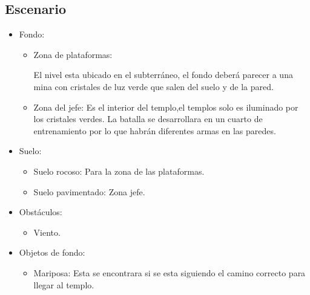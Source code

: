 \begin{itemize}
\subsection{Escenario}
\begin{itemize} 
        \item Fondo:
                \begin{itemize}
                        \item Zona de plataformas:
\\
\par
El nivel esta ubicado en el subterráneo, el fondo deberá parecer a una mina con cristales de luz verde que salen del suelo y de la pared.
                        \item Zona del jefe:
Es el interior del templo,el templos solo es iluminado por los cristales verdes. La batalla se desarrollara en un cuarto de entrenamiento por lo que habrán diferentes armas en las paredes.
                \end{itemize}
        \item Suelo:
                \begin{itemize}
                        \item Suelo rocoso: Para la zona de las plataformas.
                        \item Suelo pavimentado: Zona jefe.
                \end{itemize}
	  \item Obstáculos:
                \begin{itemize}
                        \item Viento.
                \end{itemize}
        \item Objetos de fondo:
                \begin{itemize}
                        \item Mariposa: Esta se encontrara si se esta siguiendo el camino correcto para llegar al templo.
                \end{itemize}
\end{itemize}   


\end{itemize}
